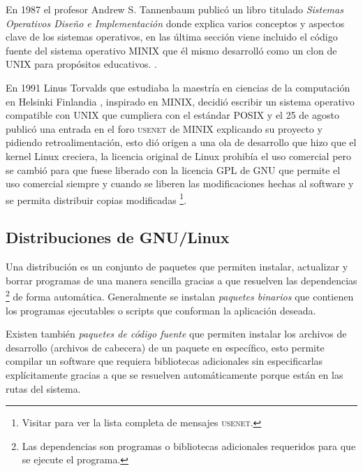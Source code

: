 En 1987 el profesor Andrew S. Tannenbaum public\'{o} un libro titulado \textit{Sistemas Operativos Dise\~{n}o e Implementaci\'{o}n} \cite{tanenbaum_operating_2006} donde explica varios conceptos y aspectos clave de los sistemas operativos, en las \'{u}ltima secci\'{o}n viene incluido el c\'{o}digo fuente del sistema operativo \textsc{MINIX} que \'{e}l mismo desarroll\'{o} como un clon de \textsc{UNIX} para prop\'{o}sitos educativos. \cite{_complete_????}.

En 1991 Linus Torvalds que estudiaba la maestr\'{i}a en ciencias de la computaci\'{o}n en Helsinki Finlandia \cite{_staff_????}, inspirado en \textsc{MINIX}, decidi\'{o} escribir un sistema operativo compatible con UNIX que cumpliera con el est\'{a}ndar \textsc{POSIX} y el 25 de agosto public\'{o} una entrada en el foro \textsc{usenet} de \textsc{MINIX} \cite{_history_????} explicando su proyecto y pidiendo retroalimentaci\'{o}n, esto di\'{o} origen a una ola de desarrollo que hizo que el kernel Linux creciera, la licencia original de Linux prohib\'{i}a el uso comercial pero se cambi\'{o} para que fuese liberado con la licencia \textsc{GPL} de \textsc{GNU} que permite el uso comercial siempre y cuando se liberen las modificaciones hechas al software y se permita distribuir copias modificadas \cite{_linux_????-3} \footnote{Visitar \cite{_linuxs_????} para ver la lista completa de mensajes \textsc{usenet}.}.


  \subsection {Distribuciones de GNU/Linux}

Una distribuci\'{o}n es un conjunto de paquetes que permiten instalar, actualizar y borrar programas de una manera sencilla gracias a que resuelven las dependencias \footnote{Las dependencias son programas o bibliotecas adicionales requeridos para que se ejecute el programa.} de forma autom\'{a}tica. Generalmente se instalan \textit{paquetes binarios} que contienen los programas ejecutables o scripts que conforman la aplicaci\'{o}n deseada.

Existen tambi\'{e}n \textit{paquetes de c\'{o}digo fuente} que permiten instalar los archivos de desarrollo (archivos de cabecera) de un paquete en espec\'{i}fico, esto permite compilar un software que requiera bibliotecas adicionales sin especificarlas expl\'{i}citamente gracias a que se resuelven autom\'{a}ticamente porque est\'{a}n en las rutas del sistema.

